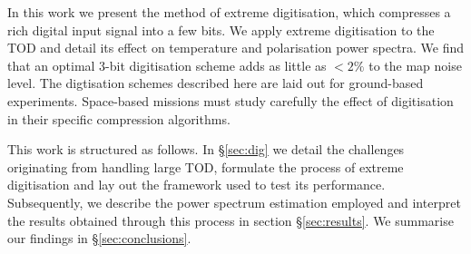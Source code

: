 \documentclass[apj]{emulateapj}
\begin{document}
In this work we present the method of extreme digitisation, which compresses a rich digital input signal into a few bits. We apply extreme digitisation to the TOD and detail its effect on temperature and polarisation power spectra. We find that an optimal 3-bit digitisation scheme adds as little as $< 2\%$ to the map noise level. The digtisation schemes described here are laid out for ground-based experiments. Space-based missions must study carefully the effect of digitisation in their specific compression algorithms.%

This work is structured as follows. In \S\ref{sec:dig} we detail the challenges originating from handling large TOD, formulate the process of extreme digitisation and lay out the framework used to test its performance. Subsequently, we describe the power spectrum estimation employed and interpret the results obtained through this process in section \S\ref{sec:results}. We summarise our findings in \S\ref{sec:conclusions}.







\end{document}
